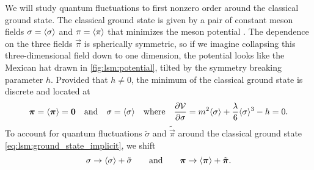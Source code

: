 We will study quantum fluctuations to first nonzero order around the classical ground state.
The classical ground state is given by a pair of constant meson fields $\sigma = \langle \sigma \rangle$ and $\pi = \langle \pi \rangle$ that minimizes the meson potential .
The dependence on the three fields $\vec{\pi}$ is spherically symmetric, so if we imagine collapsing this three-dimensional field down to one dimension, the potential looks like the Mexican hat drawn in \cref{fig:lsm:potential}, tilted by the symmetry breaking parameter $h$.
Provided that $h \neq 0$, the minimum of the classical ground state is discrete and located at 
\begin{equation}
	{\bm{\pi}} = \langle {\bm{\pi}} \rangle = {\bm{0}}
	\quad \text{and} \quad
	\sigma = \langle \sigma \rangle
	\quad \text{where} \quad
	\pdv{\mathcal{V}}{\sigma} = m^2 \langle \sigma \rangle + \frac{\lambda}{6} \langle \sigma \rangle^3 - h = 0.
\label{eq:lsm:ground_state_implicit}
\end{equation}
To account for quantum fluctuations $\tilde{\sigma}$ and $\tilde{\vec{\pi}}$ around the classical ground state \eqref{eq:lsm:ground_state_implicit}, we shift
\begin{equation}
	\sigma \rightarrow \langle \sigma \rangle + \tilde{\sigma}
	\qquad \text{and} \qquad
	{\bm{\pi}} \rightarrow \langle {\bm{\pi}} \rangle + \tilde{{\bm{\pi}}}.
\label{eq:lsm:field_shift}
\end{equation}

